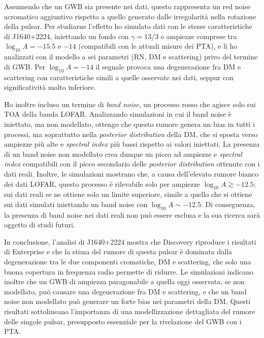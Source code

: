 \documentclass[12pt]{report}
\begin{document}
Assumendo che un GWB sia presente nei dati, questo rappresenta un red noise
acromatico aggiuntivo rispetto a quello generato dalle irregolarità nella
rotazione della pulsar. Per studiarne l'effetto ho simulato dati con le stesse
caratteristiche di J1640+2224, iniettando un fondo con $\gamma = 13/3$ e ampiezze
comprese tra $\log_{10}A = -15.5$ e $-14$ (compatibili con le attuali misure dei
PTA), e li ho analizzati con il modello a sei parametri (RN, DM e scattering)
privo del termine di GWB. Per $\log_{10}A = -14$ il segnale provoca una
degenerazione fra DM e scattering con caratteristiche simili a quelle osservate
nei dati, seppur con significatività molto inferiore. \par

Ho inoltre incluso un termine di \textit{band noise}, un processo rosso che agisce
solo sui TOA della banda LOFAR. Analizzando simulazioni in cui il band noise è
iniettato, ma non modellato, ottengo che questo rumore genera un bias in tutti i
processi, ma soprattutto nella \textit{posterior distribution} della DM, che si
sposta verso ampiezze più alte e \textit{spectral index} più bassi rispetto ai
valori iniettati. La presenza di un band noise non modellato crea dunque un picco
ad ampiezze e \textit{spectral index} compatibili con il picco secondario delle
\textit{posterior distribution} ottenute con i dati reali. Inoltre, le simulazioni
mostrano che, a causa dell'elevato rumore bianco dei dati LOFAR, questo processo è
rilevabile solo per ampiezze $\log_{10}A \gtrsim -12.5$; sui dati reali se ne
ottiene solo un limite superiore, simile a quello che si ottiene sui dati simulati
iniettando un band noise con $\log_{10}A \sim -12.5$. Di conseguenza, la presenza
di band noise nei dati reali non può essere esclusa e la sua ricerca sarà oggetto
di studi futuri. \par

In conclusione, l'analisi di J1640+2224 mostra che Discovery riproduce i
risultati di Enterprise e che la stima del rumore di questa pulsar è dominata
dalla degenerazione tra le due componenti cromatiche, DM e scattering, che solo
una buona copertura in frequenza radio permette di ridurre. Le simulazioni
indicano inoltre che un GWB di ampiezza paragonabile a quella oggi osservata, se
non modellato, può causare una degenerazione fra DM e scattering, e che un band
noise non modellato può generare un forte bias nei parametri della DM. Questi
risultati sottolineano l'importanza di una modellizzazione dettagliata del rumore
delle singole pulsar, presupposto essenziale per la rivelazione del GWB con i PTA.
\par
\end{document}
